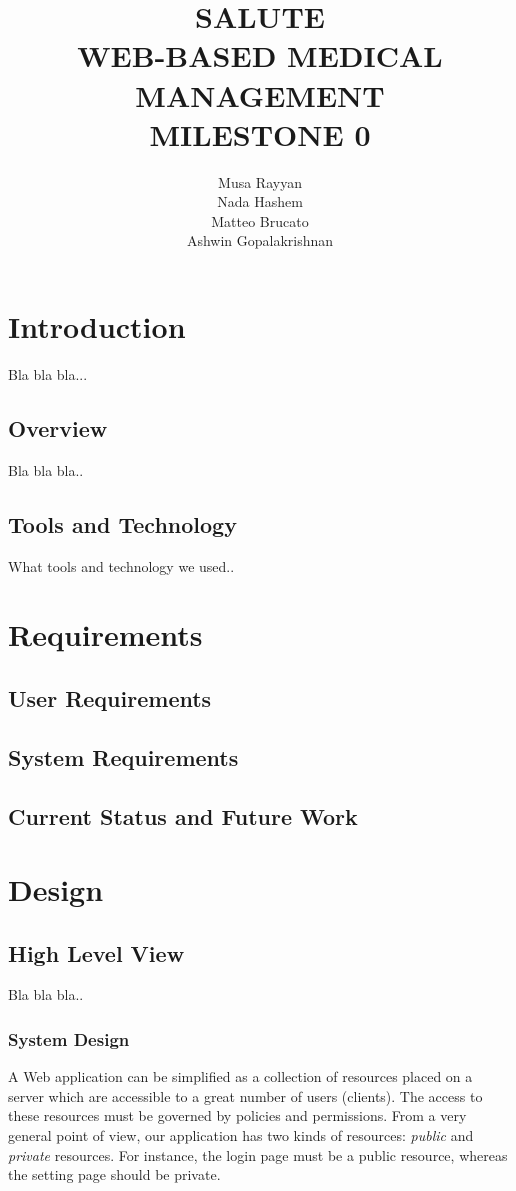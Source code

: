 \documentclass[12pt]{report}
\title{SALUTE \\ WEB-BASED MEDICAL MANAGEMENT \\ MILESTONE 0}
\author{Musa Rayyan \\ Nada Hashem \\ Matteo Brucato \\ Ashwin Gopalakrishnan}
\begin{document}
\maketitle
\tableofcontents


\part{Introduction}
Bla bla bla...
\chapter{Overview}
Bla bla bla..
\chapter{Tools and Technology}
What tools and technology we used..


\part{Requirements}
\chapter{User Requirements}
\chapter{System Requirements}
\chapter{Current Status and Future Work}


\part{Design}

\chapter{High Level View}
Bla bla bla..

\section{System Design}
A Web application can be simplified as a collection of resources placed on a server which are accessible to a great number of users (clients). The access to these resources must be governed by policies and permissions. From a very general point of view, our application has two kinds of resources: \emph{public} and \emph{private} resources. For instance, the login page must be a public resource, whereas the setting page should be private.
\end{document}
